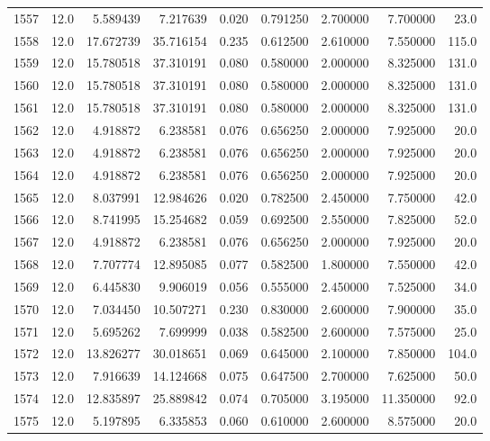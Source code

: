 \begin{tabular}{lrrrrrrrr}
1557 &   12.0 &   5.589439 &   7.217639 &  0.020 &  0.791250 &  2.700000 &   7.700000 &   23.0 \\
1558 &   12.0 &  17.672739 &  35.716154 &  0.235 &  0.612500 &  2.610000 &   7.550000 &  115.0 \\
1559 &   12.0 &  15.780518 &  37.310191 &  0.080 &  0.580000 &  2.000000 &   8.325000 &  131.0 \\
1560 &   12.0 &  15.780518 &  37.310191 &  0.080 &  0.580000 &  2.000000 &   8.325000 &  131.0 \\
1561 &   12.0 &  15.780518 &  37.310191 &  0.080 &  0.580000 &  2.000000 &   8.325000 &  131.0 \\
1562 &   12.0 &   4.918872 &   6.238581 &  0.076 &  0.656250 &  2.000000 &   7.925000 &   20.0 \\
1563 &   12.0 &   4.918872 &   6.238581 &  0.076 &  0.656250 &  2.000000 &   7.925000 &   20.0 \\
1564 &   12.0 &   4.918872 &   6.238581 &  0.076 &  0.656250 &  2.000000 &   7.925000 &   20.0 \\
1565 &   12.0 &   8.037991 &  12.984626 &  0.020 &  0.782500 &  2.450000 &   7.750000 &   42.0 \\
1566 &   12.0 &   8.741995 &  15.254682 &  0.059 &  0.692500 &  2.550000 &   7.825000 &   52.0 \\
1567 &   12.0 &   4.918872 &   6.238581 &  0.076 &  0.656250 &  2.000000 &   7.925000 &   20.0 \\
1568 &   12.0 &   7.707774 &  12.895085 &  0.077 &  0.582500 &  1.800000 &   7.550000 &   42.0 \\
1569 &   12.0 &   6.445830 &   9.906019 &  0.056 &  0.555000 &  2.450000 &   7.525000 &   34.0 \\
1570 &   12.0 &   7.034450 &  10.507271 &  0.230 &  0.830000 &  2.600000 &   7.900000 &   35.0 \\
1571 &   12.0 &   5.695262 &   7.699999 &  0.038 &  0.582500 &  2.600000 &   7.575000 &   25.0 \\
1572 &   12.0 &  13.826277 &  30.018651 &  0.069 &  0.645000 &  2.100000 &   7.850000 &  104.0 \\
1573 &   12.0 &   7.916639 &  14.124668 &  0.075 &  0.647500 &  2.700000 &   7.625000 &   50.0 \\
1574 &   12.0 &  12.835897 &  25.889842 &  0.074 &  0.705000 &  3.195000 &  11.350000 &   92.0 \\
1575 &   12.0 &   5.197895 &   6.335853 &  0.060 &  0.610000 &  2.600000 &   8.575000 &   20.0 \\

\end{tabular}
